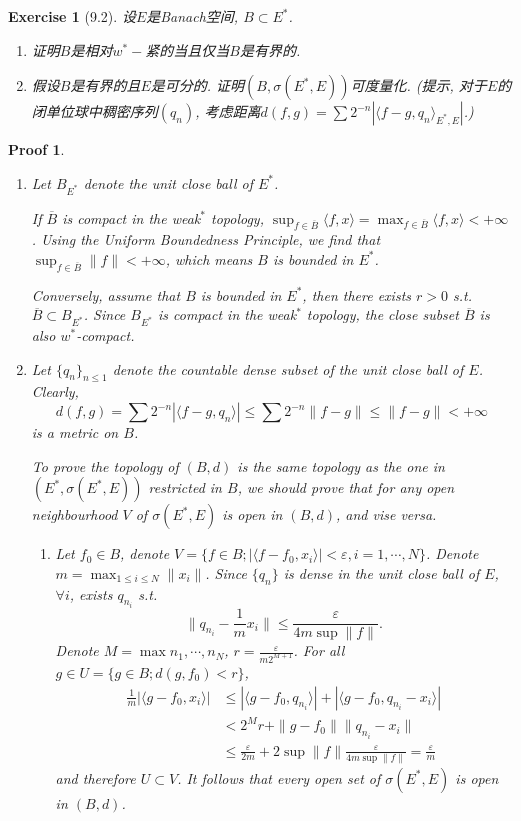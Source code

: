 \documentclass[hyperref,UTF8]{ctexart}
\newtheorem{ex}{Exercise}[section]
\newtheorem{pf}{Proof}[section]
\newcommand{\lrangle}[2]{\langle #1, #2 \rangle}
\begin{document}
\begin{ex}[9.2]
    设$E$是Banach空间, $B\subset E^*$.
    \begin{enumerate}
        \item 证明$B$是相对$w^*-$紧的当且仅当$B$是有界的.
        \item 假设$B$是有界的且$E$是可分的. 证明$(B, \sigma(E^*, E))$可度量化. (提示, 对于$E$的闭单位球中稠密序列$(q_n)$, 考虑距离$d(f, g) = \sum 2^{-n}|\langle f-g, q_n\rangle_{E^*, E}|$.)
    \end{enumerate}
\end{ex}

\begin{pf}
    \begin{enumerate}
        \item Let $B_{E^*}$ denote the unit close ball of $E^*$. 
        
        If $\overline B$ is compact in the weak$^*$ topology, $\sup_{f\in \overline B}\lrangle{f}{x} = \max_{f\in \overline B} \lrangle{f}{x}<+\infty$. Using the Uniform Boundedness Principle, we find that $\sup_{f\in\overline B}\|f\|<+\infty$, which means $B$ is bounded in $E^*$. 

        Conversely, assume that $B$ is bounded in $E^*$, then there exists $r>0$ s.t. $\overline B\subset B_{E^*}$. Since $B_{E^*}$ is compact in the weak$^*$ topology, the close subset $\overline B$ is also $w^*$-compact. 

        \item Let $\{q_n\}_{n \leq 1}$ denote the countable dense subset of the unit close ball of $E$. Clearly, \[d(f, g) = \sum 2^{-n}|\lrangle{f-g}{q_n}|\leq \sum 2^{-n} \|f - g\|\leq \|f - g\|<+\infty\] is a metric on $B$. 
        
        To prove the topology of $(B, d)$ is the same topology as the one in $(E^*, \sigma(E^*, E))$ restricted in $B$, we should prove that for any open neighbourhood $V$ of $\sigma(E^*, E)$ is open in $(B, d)$, and vise versa. 

        \begin{enumerate}
            \item Let $f_0\in B$, denote $V = \{f\in B; |\lrangle{f - f_0}{x_i}|<\varepsilon, i = 1, \cdots, N\}$. Denote $m = \max_{1\leq i\leq N} \|x_i\|$. Since $\{q_n\}$ is dense in the unit close ball of $E$, $\forall i$, exists $q_{n_i}$ s.t. \[\|q_{n_i} - \frac{1}{m} x_i\|\leq \frac{\varepsilon}{4m\sup\|f\|}. \]
            Denote $M = \max{n_1, \cdots, n_N}$, $r = \frac{\varepsilon}{m2^{M+1}}$. For all $g\in U = \{g\in B; d(g, f_0) < r\}$, 
            \[ \begin{aligned}
                \frac1m|\lrangle{g - f_0}{x_i}| 
                &\leq |\lrangle{g - f_0}{q_{n_i}}| + |\lrangle{g - f_0}{q_{n_i}-x_i}| \\
                &< 2^{M} r + \|g - f_0\|\|q_{n_i} - x_i\| \\
                &\leq \frac{\varepsilon}{2m} + 2\sup\|f\|\frac{\varepsilon}{4m\sup\|f\|} = \frac\varepsilon m
            \end{aligned} \]
            and therefore $U\subset V$. It follows that every open set of $\sigma(E^*, E)$ is open in $(B, d)$. 


\end{enumerate}
\end{enumerate}
\end{pf}
\end{document}
